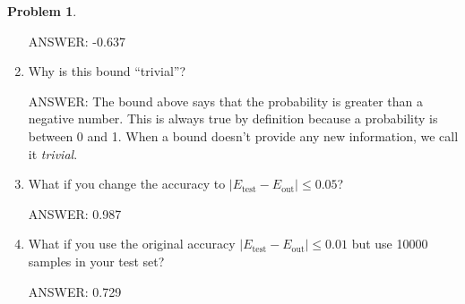 \documentclass[10pt]{exam}
\theoremstyle{definition}
\newtheorem{problem}{Problem}
\newcommand{\Eout}{E_{\text{out}}}
\newcommand{\Etest}{E_{\text{test}}}
\begin{document}
\begin{problem}
\begin{enumerate}
            ANSWER: -0.637
            \vspace{2.5in}


        \item
            Why is this bound ``trivial''?

            ANSWER:
            The bound above says that the probability is greater than a negative number.
            This is always true by definition because a probability is between 0 and 1.
            When a bound doesn't provide any new information,
            we call it \emph{trivial}.
            \vspace{3.5in}

        \item
            What if you change the accuracy to $|\Etest-\Eout| \le 0.05$?

            ANSWER: 0.987
            \vspace{3.5in}

        \item
            What if you use the original accuracy $|\Etest-\Eout| \le 0.01$ but use 10000 samples in your test set?

            ANSWER: 0.729
            \vspace{3.5in}

    \end{enumerate}
\end{problem}

%
%
%
\end{document}
